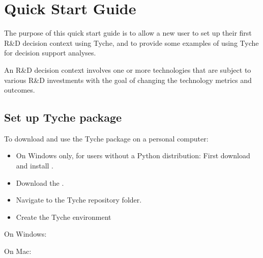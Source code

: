\documentclass[letterpaper,10pt,english]{sphinxmanual}
\begin{document}
\chapter{Quick Start Guide}
\label{\detokenize{cheat-sheet:quick-start-guide}}\label{\detokenize{cheat-sheet:sec-quickstart}}\label{\detokenize{cheat-sheet::doc}}
The purpose of this quick start guide is to allow a new user to set up their first R\&D decision context using Tyche, and to provide some examples of using Tyche for decision support analyses.

An R\&D decision context involves one or more technologies that are subject to various R\&D investments with the goal of changing the technology metrics and outcomes.


\section{Set up Tyche package}
\label{\detokenize{cheat-sheet:set-up-tyche-package}}
To download and use the Tyche package on a personal computer:
\begin{itemize}
\item {} 
On Windows only, for users without a Python distribution: First download and install .

\item {} 
Download the .

\item {} 
Navigate to the Tyche repository folder.

\item {} 
Create the Tyche environment

\end{itemize}

On Windows:

\begin{sphinxVerbatim}[commandchars=\\\{\}]
    \PYGZbs{}
  
\end{sphinxVerbatim}

On Mac:

\begin{sphinxVerbatim}[commandchars=\\\{\}]
    
  
\end{sphinxVerbatim}
\end{document}
